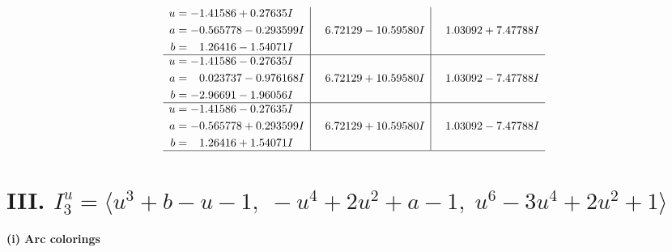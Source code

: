 \documentclass[1p]{elsarticle_modified}
\theoremstyle{definition}
\begin{document}
$$\begin{array}{c|c|c}
\begin{aligned}
u &= -1.41586 + 0.27635 I \\
a &= -0.565778 - 0.293599 I \\
b &= \phantom{-}1.26416 - 1.54071 I\end{aligned}
 & \phantom{-}6.72129 - 10.59580 I & \phantom{-}1.03092 + 7.47788 I \\ \hline\begin{aligned}
u &= -1.41586 - 0.27635 I \\
a &= \phantom{-}0.023737 - 0.976168 I \\
b &= -2.96691 - 1.96056 I\end{aligned}
 & \phantom{-}6.72129 + 10.59580 I & \phantom{-}1.03092 - 7.47788 I \\ \hline\begin{aligned}
u &= -1.41586 - 0.27635 I \\
a &= -0.565778 + 0.293599 I \\
b &= \phantom{-}1.26416 + 1.54071 I\end{aligned}
 & \phantom{-}6.72129 + 10.59580 I & \phantom{-}1.03092 - 7.47788 I\\
 \hline 
 \end{array}$$\newpage\newpage\renewcommand{\arraystretch}{1}
\centering \section*{III. $I^u_{3}= \langle u^3+b- u-1,\;- u^4+2 u^2+a-1,\;u^6-3 u^4+2 u^2+1 \rangle$}
\flushleft \textbf{(i) Arc colorings}\\
\end{document}
